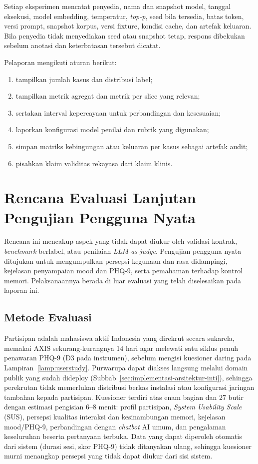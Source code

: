 Setiap eksperimen mencatat penyedia, nama dan snapshot model, tanggal eksekusi, model embedding, temperatur, \textit{top-p}, seed bila tersedia, batas token, versi prompt, snapshot korpus, versi fixture, kondisi cache, dan artefak keluaran. Bila penyedia tidak menyediakan seed atau snapshot tetap, respons dibekukan sebelum anotasi dan keterbatasan tersebut dicatat.

Pelaporan mengikuti aturan berikut:

\begin{enumerate}[label=\arabic*.,leftmargin=*,itemsep=3pt]
  \item tampilkan jumlah kasus dan distribusi label;
  \item tampilkan metrik agregat dan metrik per slice yang relevan;
  \item sertakan interval kepercayaan untuk perbandingan dan kesesuaian;
  \item laporkan konfigurasi model penilai dan rubrik yang digunakan;
  \item simpan matriks kebingungan atau keluaran per kasus sebagai artefak audit;
  \item pisahkan klaim validitas rekayasa dari klaim klinis.
\end{enumerate}

\section{Rencana Evaluasi Lanjutan Pengujian Pengguna Nyata}
\label{sec:evaluasi-pengguna}

Rencana ini mencakup aspek yang tidak dapat diukur oleh validasi kontrak, \textit{benchmark} berlabel, atau penilaian \textit{LLM-as-judge}. Pengujian pengguna nyata ditujukan untuk mengumpulkan persepsi kegunaan dan rasa didampingi, kejelasan penyampaian mood dan PHQ-9, serta pemahaman terhadap kontrol memori. Pelaksanaannya berada di luar evaluasi yang telah diselesaikan pada laporan ini.

\subsection{Metode Evaluasi}

Partisipan adalah mahasiswa aktif Indonesia yang direkrut secara sukarela, memakai AXIS sekurang-kurangnya 14 hari agar melewati satu siklus penuh penawaran PHQ-9 (D3 pada instrumen), sebelum mengisi kuesioner daring pada Lampiran~\ref{lamp:userstudy}. Purwarupa dapat diakses langsung melalui domain publik yang sudah dideploy (Subbab~\ref{sec:implementasi-arsitektur-inti}), sehingga perekrutan tidak memerlukan distribusi berkas instalasi atau konfigurasi jaringan tambahan kepada partisipan. Kuesioner terdiri atas enam bagian dan 27 butir dengan estimasi pengisian 6--8 menit: profil partisipan, \textit{System Usability Scale} (SUS), persepsi kualitas interaksi dan kesinambungan memori, kejelasan mood/PHQ-9, perbandingan dengan \textit{chatbot} AI umum, dan pengalaman keseluruhan beserta pertanyaan terbuka. Data yang dapat diperoleh otomatis dari sistem (durasi sesi, skor PHQ-9) tidak ditanyakan ulang, sehingga kuesioner murni menangkap persepsi yang tidak dapat diukur dari sisi sistem.

